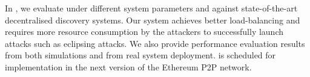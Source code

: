 In , we evaluate \sysname under different system parameters and against state-of-the-art decentralised discovery systems. Our system achieves better load-balancing and requires more resource consumption by the attackers to successfully launch attacks such as eclipsing attacks. We also provide performance evaluation results from both simulations and from real system deployment. \sysname is scheduled for implementation in the next version of the Ethereum P2P network. 

